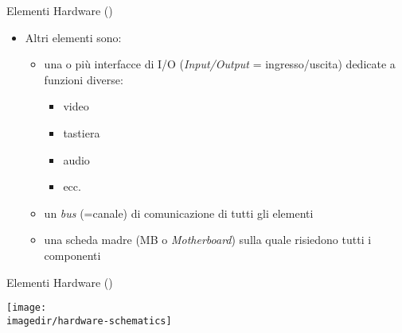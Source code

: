 \begin{slide}{{Elementi Hardware ()}}
{

	\begin{itemize}

		\item Altri elementi sono:

			 \begin{itemize}
			 \setlength{\itemsep}{4mm}

				\item una o pi\`u interfacce di I/O
				      (\emph{Input/Output} = ingresso/uscita)
					  dedicate a funzioni diverse:

					\vspace{4mm}
					\begin{itemize}

						\item video

						\item tastiera

						\item audio

						\item ecc.

					\end{itemize}

				\item un \emph{bus} (=canale) di comunicazione
				      di tutti gli elementi

				\item una scheda madre (MB o \emph{Motherboard})
				      sulla quale risiedono tutti i componenti

			\end{itemize}

	\end{itemize}

}
\end{slide}

\begin{slide}{{Elementi Hardware ()}}
{

	\begin{center}
		\texttt{[image: \\imagedir/hardware-schematics]}
	\end{center}

}
\end{slide}

